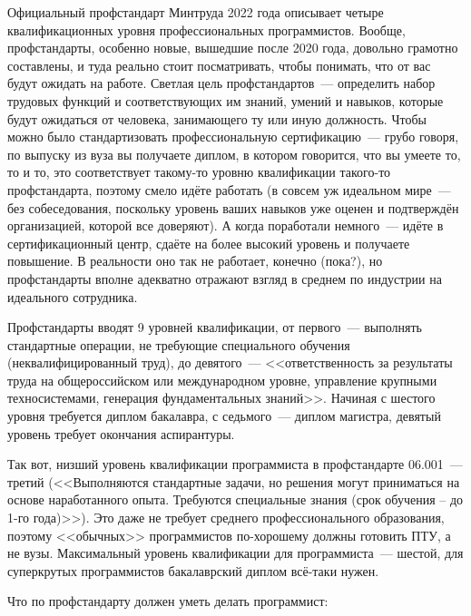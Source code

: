 \documentclass{../../text-style}
\begin{document}
Официальный профстандарт Минтруда 2022 года описывает четыре квалификационных уровня профессиональных программистов. Вообще, профстандарты, особенно новые, вышедшие после 2020 года, довольно грамотно составлены, и туда реально стоит посматривать, чтобы понимать, что от вас будут ожидать на работе. Светлая цель профстандартов~--- определить набор трудовых функций и соответствующих им знаний, умений и навыков, которые будут ожидаться от человека, занимающего ту или иную должность. Чтобы можно было стандартизовать профессиональную сертификацию~--- грубо говоря, по выпуску из вуза вы получаете диплом, в котором говорится, что вы умеете то, то и то, это соответствует такому-то уровню квалификации такого-то профстандарта, поэтому смело идёте работать (в совсем уж идеальном мире~--- без собеседования, поскольку уровень ваших навыков уже оценен и подтверждён организацией, которой все доверяют). А когда поработали немного~--- идёте в сертификационный центр, сдаёте на более высокий уровень и получаете повышение. В реальности оно так не работает, конечно (пока?), но профстандарты вполне адекватно отражают взгляд в среднем по индустрии на идеального сотрудника.

Профстандарты вводят 9 уровней квалификации, от первого~--- выполнять стандартные операции, не требующие специального обучения (неквалифицированный труд), до девятого~--- <<ответственность за результаты труда на общероссийском или международном уровне, управление крупными техносистемами, генерация фундаментальных знаний>>. Начиная с шестого уровня требуется диплом бакалавра, с седьмого~--- диплом магистра, девятый уровень требует окончания аспирантуры. 

Так вот, низший уровень квалификации программиста в профстандарте 06.001~--- третий (<<Выполняются стандартные задачи, но решения могут приниматься на основе наработанного опыта. Требуются специальные знания (срок обучения – до 1-го года)>>). Это даже не требует среднего профессионального образования, поэтому <<обычных>> программистов по-хорошему должны готовить ПТУ, а не вузы. Максимальный уровень квалификации для программиста~--- шестой, для суперкрутых программистов бакалаврский диплом всё-таки нужен.

Что по профстандарту должен уметь делать программист:
\end{document}
